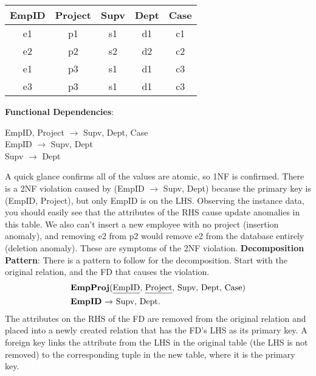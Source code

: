 \documentclass{report}
\begin{document}
\begin{itemize}
            \bigbreak \noindent 
            \begin{center}
            \begin{tabular}{|c|c|c|c|c|}
                \hline
                EmpID & Project & Supv & Dept & Case \\ \hline
                e1    & p1      & s1   & d1   & c1   \\ \hline
                e2    & p2      & s2   & d2   & c2   \\ \hline
                e1    & p3      & s1   & d1   & c3   \\ \hline
                e3    & p3      & s1   & d1   & c3   \\ \hline
            \end{tabular}
        \end{center}
        \bigbreak \noindent 
            \textbf{Functional Dependencies}:
            \begin{center}
                EmpID, Project $\to$ Supv, Dept, Case \\
                EmpID $\to$ Supv, Dept \\
                Supv $\to$ Dept
            \end{center}
            \bigbreak \noindent 
            A quick glance confirms all of the values are atomic, so 1NF is confirmed.
            \bigbreak \noindent 
            There is a 2NF violation caused by (EmpID $\to$ Supv, Dept) because the primary key is (EmpID, Project), but only EmpID is on the LHS.
            \bigbreak \noindent 
            Observing the instance data, you should easily see that the attributes of the RHS cause update anomalies in this
            table. We also can’t insert a new employee with no project (insertion anomaly), and removing e2 from p2 would
            remove e2 from the database entirely (deletion anomaly). These are symptoms of the 2NF violation.
            \bigbreak \noindent 
            \textbf{Decomposition Pattern}: There is a pattern to follow for the decomposition. Start with the original relation, and the FD that causes the violation.
            \begin{align*}
                &\text{\textbf{EmpProj}(\underline{EmpID}, \underline{Project}, Supv, Dept, Case)} \\
                &\text{\textbf{EmpID} $\to$ Supv, Dept}
            .\end{align*}
            \bigbreak \noindent 
            The attributes on the RHS of the FD are removed from the original relation and placed into a newly created relation that has the FD’s LHS as its primary key. A foreign key links the attribute from the LHS in the original table (the LHS is not removed) to the corresponding tuple in the new table, where it is the primary key.

\end{itemize}
\end{document}
